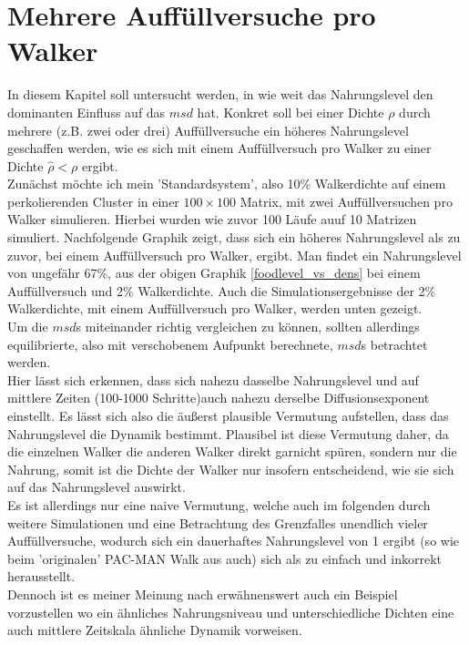 \documentclass[a4paper, 12pt]{report}
\begin{document}
\section{Mehrere Auffüllversuche pro Walker}
In diesem Kapitel soll untersucht werden, in wie weit das Nahrungslevel den dominanten Einfluss auf das $msd$ hat. Konkret soll bei einer Dichte $\rho$ durch mehrere (z.B. zwei oder drei) Auffüllversuche ein höheres Nahrungslevel geschaffen werden, wie es sich mit einem Auffüllversuch pro Walker zu einer Dichte $\hat{\rho}<\rho$ ergibt.
\\
Zunächst möchte ich mein 'Standardsystem', also 10\% Walkerdichte auf einem perkolierenden Cluster in einer $100\times100$ Matrix, mit zwei Auffüllversuchen pro Walker simulieren. Hierbei wurden wie zuvor 100 Läufe auuf 10 Matrizen simuliert. Nachfolgende Graphik zeigt, dass sich ein höheres Nahrungslevel als zu zuvor, bei einem Auffüllversuch pro Walker, ergibt. Man findet ein Nahrungslevel von ungefähr 67\%, aus der obigen Graphik \ref{foodlevel_vs_dens} bei einem Auffüllversuch und 2\% Walkerdichte. Auch die Simulationsergebnisse der 2\% Walkerdichte, mit einem Auffüllversuch pro Walker, werden unten gezeigt.
\\
Um die $msd$s miteinander richtig vergleichen zu können, sollten allerdings equilibrierte, also mit verschobenem Aufpunkt berechnete, $msd$s betrachtet werden.
\\
Hier lässt sich erkennen, dass sich nahezu dasselbe Nahrungslevel und auf mittlere Zeiten (100-1000 Schritte)auch nahezu derselbe Diffusionsexponent einstellt. Es lässt sich also die äußerst plausible Vermutung aufstellen, dass das Nahrungslevel die Dynamik bestimmt. Plausibel ist diese Vermutung daher, da die einzelnen Walker die anderen Walker direkt garnicht spüren, sondern nur die Nahrung, somit ist die Dichte der Walker nur insofern entscheidend, wie sie sich auf das Nahrungslevel auswirkt.
\\
Es ist allerdings nur eine naive Vermutung, welche auch im folgenden durch weitere Simulationen und eine Betrachtung des Grenzfalles unendlich vieler Auffüllversuche, wodurch sich ein dauerhaftes Nahrungslevel von 1 ergibt (so wie beim 'originalen' PAC-MAN Walk aus \cite{doi:10.1063/1.4999485} auch) sich als zu einfach und inkorrekt herausstellt.
\\
Dennoch ist es meiner Meinung nach erwähnenswert auch ein Beispiel vorzustellen wo ein ähnliches  Nahrungsniveau und unterschiedliche Dichten eine auch mittlere Zeitskala ähnliche Dynamik vorweisen.
\end{document}
